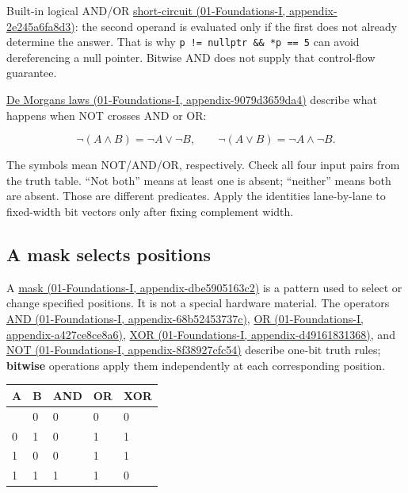 Built-in logical AND/OR \href{../01-Foundations-I/main.pdf\#nameddest=appendix-2e245a6fa8d3}{short-circuit (01-Foundations-I, appendix-2e245a6fa8d3)}: the second operand is evaluated only if the first does not already determine the answer. That is why \texttt{p\ !=\ nullptr\ \&\&\ *p\ ==\ 5} can avoid dereferencing a null pointer. Bitwise AND does not supply that control-flow guarantee.

\href{../01-Foundations-I/main.pdf\#nameddest=appendix-9079d3659da4}{De Morgan\textquotesingle s laws (01-Foundations-I, appendix-9079d3659da4)} describe what happens when NOT crosses AND or OR:

\[
\neg(A\land B)=\neg A\lor\neg B,\qquad
\neg(A\lor B)=\neg A\land\neg B.
\]

The symbols mean NOT/AND/OR, respectively. Check all four input pairs from the truth table. ``Not both'' means at least one is absent; ``neither'' means both are absent. Those are different predicates. Apply the identities lane-by-lane to fixed-width bit vectors only after fixing complement width.

\subsection{A mask selects positions}\label{05-engine-i-ch001-a-mask-selects-positions}

A \href{../01-Foundations-I/main.pdf\#nameddest=appendix-dbe5905163c2}{mask (01-Foundations-I, appendix-dbe5905163c2)} is a pattern used to select or change specified positions. It is not a special hardware material. The operators \href{../01-Foundations-I/main.pdf\#nameddest=appendix-68b52453737c}{AND (01-Foundations-I, appendix-68b52453737c)}, \href{../01-Foundations-I/main.pdf\#nameddest=appendix-a427ce8ce8a6}{OR (01-Foundations-I, appendix-a427ce8ce8a6)}, \href{../01-Foundations-I/main.pdf\#nameddest=appendix-d49161831368}{XOR (01-Foundations-I, appendix-d49161831368)}, and \href{../01-Foundations-I/main.pdf\#nameddest=appendix-8f38927cfc54}{NOT (01-Foundations-I, appendix-8f38927cfc54)} describe one-bit truth rules; \textbf{bitwise} operations apply them independently at each corresponding position.

{\def\LTcaptype{none} %
\begin{longtable}[]{@{}lllll@{}}
\toprule\noalign{}
A & B & AND & OR & XOR \\
\midrule\noalign{}
\endhead
\bottomrule\noalign{}
\endlastfoot
0 & 0 & 0 & 0 & 0 \\
0 & 1 & 0 & 1 & 1 \\
1 & 0 & 0 & 1 & 1 \\
1 & 1 & 1 & 1 & 0 \\
\end{longtable}
}

